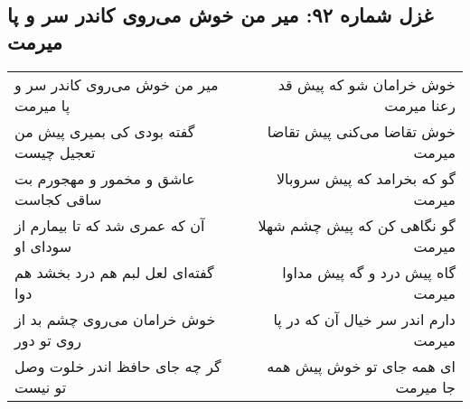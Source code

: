 \begin{center}
\section*{غزل شماره ۹۲: میر من خوش می‌روی کاندر سر و پا میرمت}
\label{sec:sh092}
\begin{longtable}{l p{0.5cm} r}
میر من خوش می‌روی کاندر سر و پا میرمت
&&
خوش خرامان شو که پیش قد رعنا میرمت
\\
گفته بودی کی بمیری پیش من تعجیل چیست
&&
خوش تقاضا می‌کنی پیش تقاضا میرمت
\\
عاشق و مخمور و مهجورم بت ساقی کجاست
&&
گو که بخرامد که پیش سروبالا میرمت
\\
آن که عمری شد که تا بیمارم از سودای او
&&
گو نگاهی کن که پیش چشم شهلا میرمت
\\
گفته‌ای لعل لبم هم درد بخشد هم دوا
&&
گاه پیش درد و گه پیش مداوا میرمت
\\
خوش خرامان می‌روی چشم بد از روی تو دور
&&
دارم اندر سر خیال آن که در پا میرمت
\\
گر چه جای حافظ اندر خلوت وصل تو نیست
&&
ای همه جای تو خوش پیش همه جا میرمت
\\
\end{longtable}
\end{center}
